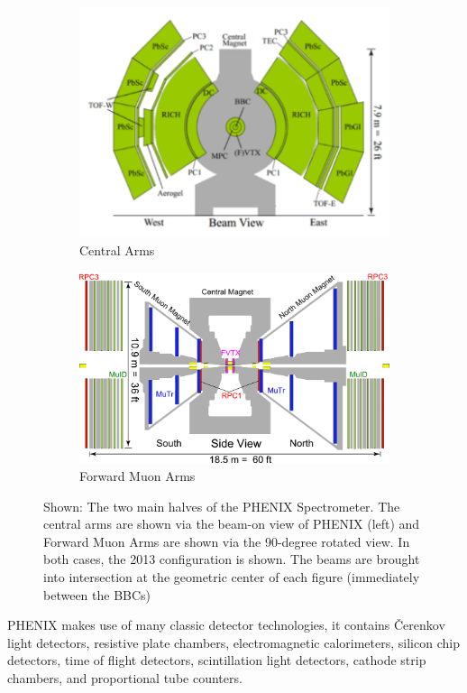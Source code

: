 \begin{figure}
  \centering
  \begin{subfigure}[t]{\textwidth}
    \centering
    \includegraphics[width=0.8\linewidth]{./figures/phenix_2013_config_central_arms}
    \caption{Central Arms}
    \label{fig:phenix_central} 
  \end{subfigure} 
  \begin{subfigure}[t]{\textwidth}
    \centering
    \includegraphics[width=0.8\linewidth]{./figures/phenix_2013_config_muon_arms}
    \caption{Forward Muon Arms}
    \label{fig:phenix_forward}
  \end{subfigure}
  \caption{
    Shown: The two main halves of the PHENIX Spectrometer. The central arms are
    shown via the beam-on view of PHENIX (left) and Forward Muon Arms are shown
    via the 90-degree rotated view. In both cases, the 2013 configuration is
    shown. The beams are brought into intersection at the geometric center of
    each figure (immediately between the BBCs)
  }
  \label{fig:phenix_2013_config}
\end{figure}

PHENIX makes use of many classic detector technologies, it contains \v{C}erenkov
light detectors, resistive plate chambers, electromagnetic calorimeters, silicon
chip detectors, time of flight detectors, scintillation light detectors, cathode
strip chambers, and proportional tube counters.

